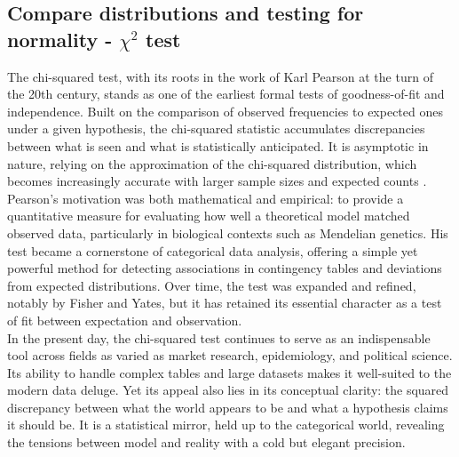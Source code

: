 \documentclass{book}
\begin{document}
\newpage

\subsection{Compare distributions and testing for normality - $\chi^{2}$ test}

The chi-squared test, with its roots in the work of Karl Pearson at the turn of the 20th century, stands as one of the earliest formal tests of goodness-of-fit and independence. Built on the comparison of observed frequencies to expected ones under a given hypothesis, the chi-squared statistic accumulates discrepancies between what is seen and what is statistically anticipated. It is asymptotic in nature, relying on the approximation of the chi-squared distribution, which becomes increasingly accurate with larger sample sizes and expected counts \cite{pearson1900}.\\

Pearson’s motivation was both mathematical and empirical: to provide a quantitative measure for evaluating how well a theoretical model matched observed data, particularly in biological contexts such as Mendelian genetics. His test became a cornerstone of categorical data analysis, offering a simple yet powerful method for detecting associations in contingency tables and deviations from expected distributions. Over time, the test was expanded and refined, notably by Fisher and Yates, but it has retained its essential character as a test of fit between expectation and observation.\\

In the present day, the chi-squared test continues to serve as an indispensable tool across fields as varied as market research, epidemiology, and political science. Its ability to handle complex tables and large datasets makes it well-suited to the modern data deluge. Yet its appeal also lies in its conceptual clarity: the squared discrepancy between what the world appears to be and what a hypothesis claims it should be. It is a statistical mirror, held up to the categorical world, revealing the tensions between model and reality with a cold but elegant precision.\\
\end{document}
